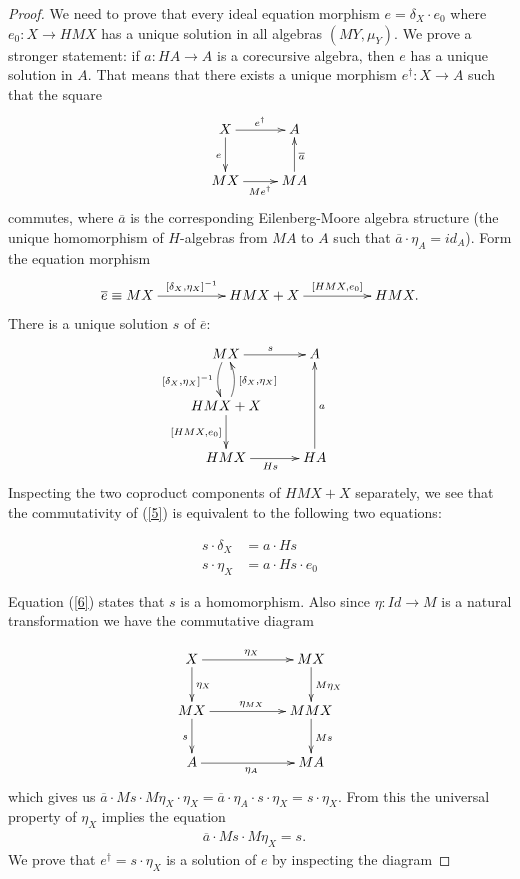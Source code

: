 \documentclass{LMCS}
\theoremstyle{plain}
\theoremstyle{definition}
\numberwithin{equation}{section}
\begin{document}
\begin{proof}
We need to prove that every ideal equation morphism
$e=\delta_{X}\cdot e_0$ where $e_0:X\rightarrow HMX$  has a unique
solution in all algebras $(MY,\mu_Y)$. We prove a stronger statement:
if $a:HA\rightarrow A$ is a corecursive algebra, then $e$ has a unique
solution in $A$. That means that there exists a unique morphism $e^\dagger:X\rightarrow A$ such that the square
$$
\xymatrix{
X\ar[r]^{e^\dagger}\ar[d]_e&A\\
MX\ar[r]_{Me^\dagger}&MA\ar[u]_{\overline a}
}
$$
commutes, where $\overline a$ is  the corresponding Eilenberg-Moore algebra structure (the unique homomorphism of $H$-algebras from $MA$ to $A$ such that  $\overline a\cdot \eta_A=id_A$).
Form the equation morphism
$$ \xymatrix@C+2pc{\overline e\equiv MX\ar[r]^-{[\delta_X,\eta_X]^{-1}}&HMX+X\ar[r]^-{[HMX,e_0]}&HMX.}$$ 
There is a unique solution $s$ of $\overline e$:
\begin{equation}\label{5}\vcenter{
\xymatrix{
MX\ar[r]^{s}\ar@/_/[d]_{[\delta_{X},\eta_X]^{-1}}&A\\
HMX+X\ar@/_/[u]_{[\delta_{X},\eta_X]}\ar[d]_{[HMX,e_0]}\\
HMX\ar[r]_{Hs}&HA\ar[uu]_{a\ \ \ \ \ \ \ }
}}
\end{equation}
Inspecting the two coproduct components of $HMX+X$ separately, we see
that the commutativity of (\ref{5}) is equivalent to the following two
equations: 

\begin{align}
s\cdot\delta_{X}&=a\cdot Hs\label{6}\\
s\cdot\eta_X&=a\cdot Hs\cdot e_0\label{7}
\end{align}

Equation (\ref{6})  states that $s$ is a homomorphism. Also since $\eta:Id\rightarrow M$ is a natural transformation we have the commutative diagram


$$
\xymatrix{
X\ar[d]^{\eta_X}\ar[rr]^{\eta_X}&&MX\ar[d]^{M\eta_X}\\
MX\ar[d]_{s}\ar[rr]^{\eta_{MX}}&&MMX\ar[d]^{Ms}\\
A\ar[rr]_{\eta_A}&&MA
}
$$
which gives us $\overline a\cdot Ms\cdot M\eta_X\cdot \eta_X=\overline
a\cdot \eta_A\cdot s\cdot \eta_X=s\cdot\eta_X$. From this the
universal property of $\eta_X$ implies the equation
 \begin{align}
\overline a\cdot Ms\cdot M\eta_X=s. &\label{8}
\end{align}
We prove that $e^\dagger=s\cdot \eta_X$ is a solution of $e$ by inspecting the diagram


\end{proof}
\end{document}
